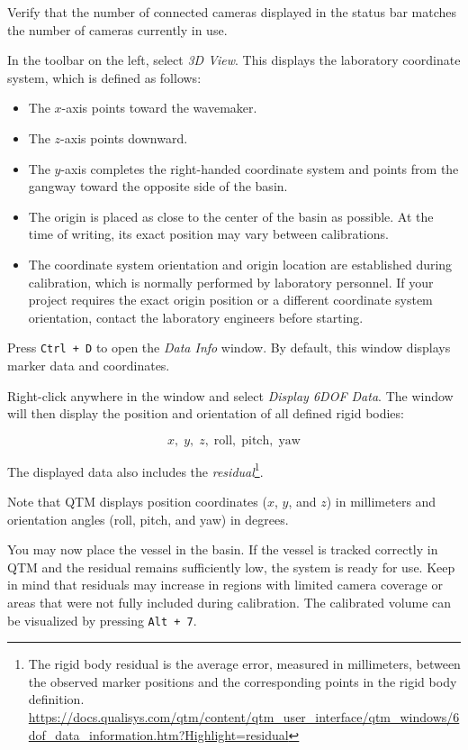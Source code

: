 \documentclass[12pt,a4paper]{article}
\begin{document}
	Verify that the number of connected cameras displayed in the status bar matches the number of cameras currently in use.
	
	In the toolbar on the left, select \textit{3D View}. This displays the laboratory coordinate system, which is defined as follows:
	

\begin{itemize}
	\item The $x$-axis points toward the wavemaker.
	\item The $z$-axis points downward.
	\item The $y$-axis completes the right-handed coordinate system and points from the gangway toward the opposite side of the basin.
	\item The origin is placed as close to the center of the basin as possible. At the time of writing, its exact position may vary between calibrations.
	\item The coordinate system orientation and origin location are established during calibration, which is normally performed by laboratory personnel. If your project requires the exact origin position or a different coordinate system orientation, contact the laboratory engineers before starting.
\end{itemize}

Press \texttt{Ctrl + D} to open the \textit{Data Info} window. By default, this window displays marker data and coordinates.

Right-click anywhere in the window and select \textit{Display 6DOF Data}. The window will then display the position and orientation of all defined rigid bodies:

\[
x,\; y,\; z,\; \text{roll},\; \text{pitch},\; \text{yaw}
\]

The displayed data also includes the \textit{residual}\footnote{
	The rigid body residual is the average error, measured in millimeters, between the observed marker positions and the corresponding points in the rigid body definition.
	\url{https://docs.qualisys.com/qtm/content/qtm_user_interface/qtm_windows/6dof_data_information.htm?Highlight=residual}
}.

Note that QTM displays position coordinates ($x$, $y$, and $z$) in millimeters and orientation angles (roll, pitch, and yaw) in degrees.

You may now place the vessel in the basin. If the vessel is tracked correctly in QTM and the residual remains sufficiently low, the system is ready for use. Keep in mind that residuals may increase in regions with limited camera coverage or areas that were not fully included during calibration. The calibrated volume can be visualized by pressing \texttt{Alt + 7}.
\end{document}
